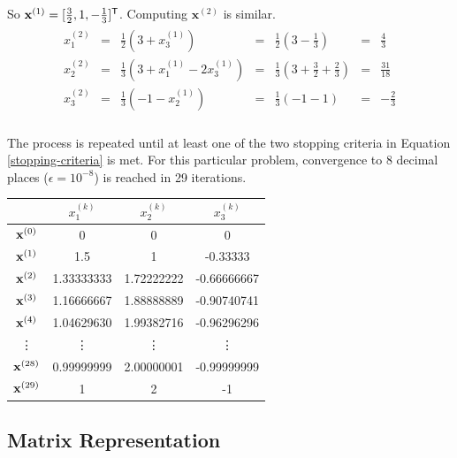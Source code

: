 So $\mathbf{x}^{(1)} = [\frac{3}{2}, 1, -\frac{1}{3}]^{\mathsf T}$.
Computing $\mathbf{x}^{(2)}$ is similar.
\begin{align*}
\begin{array}{ccccccc}
x^{(2)}_1 & = & \frac{1}{2} ( 3 + x^{(1)}_3)  & = & \frac{1}{2} (3 - \frac{1}{3})     & = & \frac{4}{3} \\
x^{(2)}_2 & = & \frac{1}{3} ( 3 + x^{(1)}_1 - 2x^{(1)}_3) & = & \frac{1}{3} (3 + \frac{3}{2} + \frac{2}{3}) & = &  \frac{31}{18} \\
x^{(2)}_3 & = & \frac{1}{3} ( -1 - x^{(1)}_2)       & = & \frac{1}{3} (-1 - 1)    & = & -\frac{2}{3} \\
\end{array}
\end{align*}

The process is repeated until at least one of the two stopping criteria in Equation \ref{stopping-criteria} is met.
For this particular problem, convergence to 8 decimal places ($\epsilon = 10^{-8}$) is reached in 29 iterations.

\begin{center}
\begin{tabular}{c|ccc}
    & $x^{(k)}_1$ & $x^{(k)}_2$ & $x^{(k)}_3$ \\
    \hline
    $\mathbf{x}^{(0)}$ & 0 & 0 & 0 \\
    $\mathbf{x}^{(1)}$ & 1.5 & 1 & -0.33333 \\
    $\mathbf{x}^{(2)}$  & 1.33333333 & 1.72222222 & -0.66666667 \\
    $\mathbf{x}^{(3)}$  & 1.16666667 & 1.88888889 & -0.90740741 \\
    $\mathbf{x}^{(4)}$  & 1.04629630 & 1.99382716 & -0.96296296 \\
    \vdots      & \vdots     & \vdots     & \vdots      \\
    $\mathbf{x}^{(28)}$ & 0.99999999 & 2.00000001 & -0.99999999 \\
    $\mathbf{x}^{(29)}$ & 1          & 2          & -1          \\
\end{tabular}
\end{center}

\subsection*{Matrix Representation} %

